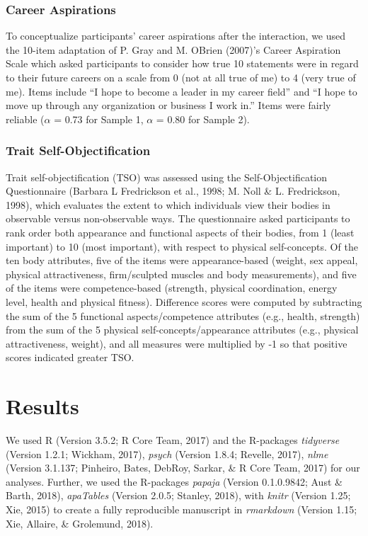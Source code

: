 \documentclass[man]{apa6}
\begin{document}
\subsubsection{Career Aspirations}\label{career-aspirations}

To conceptualize participants' career aspirations after the interaction,
we used the 10-item adaptation of P. Gray and M. OBrien (2007)'s Career
Aspiration Scale which asked participants to consider how true 10
statements were in regard to their future careers on a scale from 0 (not
at all true of me) to 4 (very true of me). Items include \enquote{I hope
to become a leader in my career field} and \enquote{I hope to move up
through any organization or business I work in.} Items were fairly
reliable (\(\alpha\) = 0.73 for Sample 1, \(\alpha\) = 0.80 for Sample
2).

\subsubsection{Trait
Self-Objectification}\label{trait-self-objectification}

Trait self-objectification (TSO) was assessed using the
Self-Objectification Questionnaire (Barbara L Fredrickson et al., 1998;
M. Noll \& L. Fredrickson, 1998), which evaluates the extent to which
individuals view their bodies in observable versus non-observable ways.
The questionnaire asked participants to rank order both appearance and
functional aspects of their bodies, from 1 (least important) to 10 (most
important), with respect to physical self-concepts. Of the ten body
attributes, five of the items were appearance-based (weight, sex appeal,
physical attractiveness, firm/sculpted muscles and body measurements),
and five of the items were competence-based (strength, physical
coordination, energy level, health and physical fitness). Difference
scores were computed by subtracting the sum of the 5 functional
aspects/competence attributes (e.g., health, strength) from the sum of
the 5 physical self-concepts/appearance attributes (e.g., physical
attractiveness, weight), and all measures were multiplied by -1 so that
positive scores indicated greater TSO.

\section{Results}\label{results}

We used R (Version 3.5.2; R Core Team, 2017) and the R-packages
\emph{tidyverse} (Version 1.2.1; Wickham, 2017), \emph{psych} (Version
1.8.4; Revelle, 2017), \emph{nlme} (Version 3.1.137; Pinheiro, Bates,
DebRoy, Sarkar, \& R Core Team, 2017) for our analyses. Further, we used
the R-packages \emph{papaja} (Version 0.1.0.9842; Aust \& Barth, 2018),
\emph{apaTables} (Version 2.0.5; Stanley, 2018), with \emph{knitr}
(Version 1.25; Xie, 2015) to create a fully reproducible manuscript in
\emph{rmarkdown} (Version 1.15; Xie, Allaire, \& Grolemund, 2018).
\end{document}
